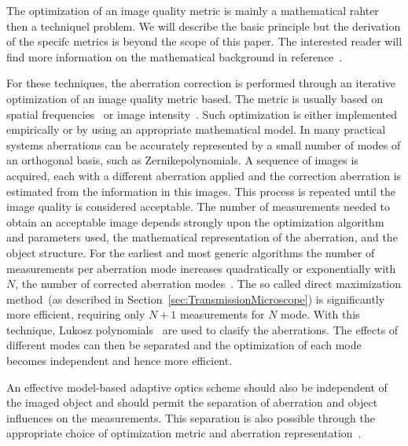 
The optimization of an image quality metric is mainly a mathematical rahter then a techniquel problem. We will describe the basic principle but the derivation of the specifc metrics is beyond the scope of this paper. The interested reader will find more information on the mathematical background in reference~\cite{wide_parabolic_optimization,wide_sphere_packing,wide_Lukosz_Modes,wide_AOM_loew_freq}. 

For these techniques, the aberration correction is performed through an iterative optimization of an image quality metric based. The metric is usually based on spatial frequencies~\cite{wide_AOM_loew_freq} or image intensity~\cite{indirect_metric_intensity}. Such optimization is either implemented empirically or by using an appropriate mathematical model. In many practical systems aberrations can be accurately represented by a small number of modes of an orthogonal basis, such as Zernikepolynomials. A sequence of images is acquired, each with a different aberration applied and the correction aberration is estimated from the information in this images. This process is repeated until the image quality is considered acceptable. The number of measurements needed to obtain an acceptable image depends strongly upon the optimization algorithm and parameters used, the mathematical representation of the aberration, and the object structure. For the earliest and most generic algorithms the number of measurements per aberration mode increases quadratically or exponentially with $N$, the number of corrected aberration modes~\cite{wide_sphere_packing}. The so called direct maximization method~(as described in Section~\ref{sec:TransmissionMicroscope}) is significantly more efficient, requiring only $N+1$ measurements for $N$ mode. With this technique, Lukosz polynomials~\cite{wide_Lukosz_Modes} are used to clasify the aberrations. The effects of different modes can then be separated and the optimization of each mode becomes independent and hence more efficient.

An effective model-based adaptive optics scheme should also be independent of the imaged object and should permit the separation of aberration and object influences on the measurements. This separation is also possible through the appropriate choice of optimization metric and aberration representation~\cite{wide_AOM_loew_freq}.


